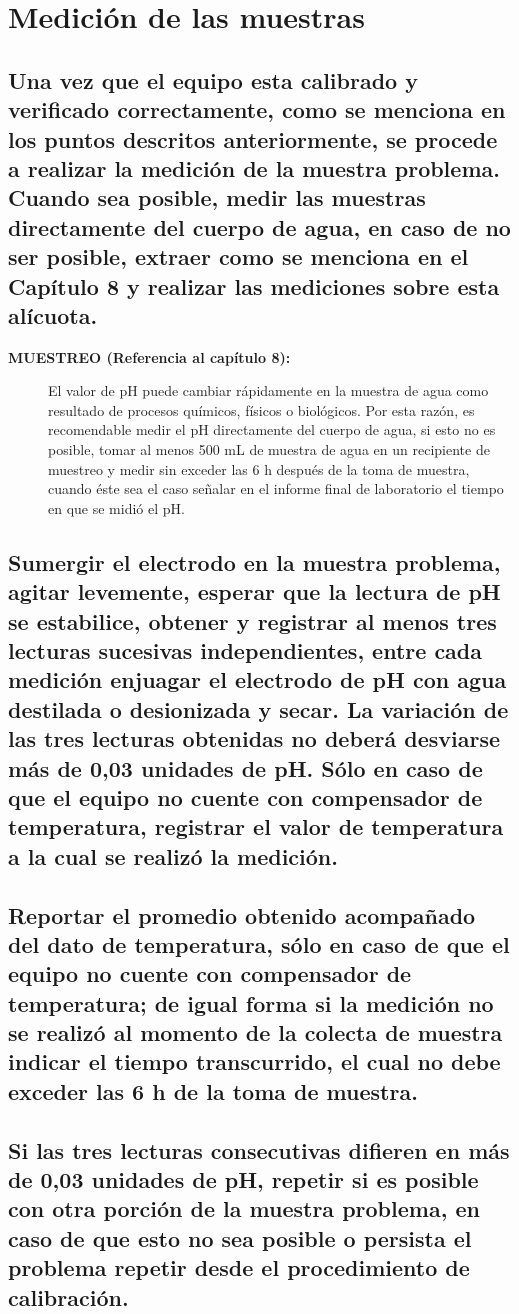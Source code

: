 \documentclass[spanish,12pt,letterpaper,titlepage]{article}
\theoremstyle{definition}
\begin{document}
	\section{Medición de las muestras}\label{9.3}
	\subsection{Una vez que el equipo esta calibrado y verificado correctamente, como se menciona en los puntos descritos anteriormente, se procede a realizar la medición de la muestra problema. Cuando sea posible, medir las muestras directamente del cuerpo de agua, en caso de no ser posible, extraer como se menciona en el Capítulo 8 y realizar las mediciones sobre esta alícuota.}\label{9.3.1}
	\begin{description}
		\item[\textbf{MUESTREO (Referencia al capítulo 8):}] El valor de pH puede cambiar rápidamente en la muestra de agua como resultado de procesos químicos, físicos o biológicos. Por esta razón, es recomendable medir el pH directamente del cuerpo de agua, si esto no es posible, tomar al menos 500 mL de muestra de agua en un recipiente de muestreo y medir sin exceder las 6 h después de la toma de muestra, cuando éste sea el caso señalar en el informe final de laboratorio el tiempo en que se midió el pH.
	\end{description}
	\subsection{Sumergir el electrodo en la muestra problema, agitar levemente, esperar que la lectura de pH se estabilice, obtener y registrar al menos tres lecturas sucesivas independientes, entre cada medición enjuagar el electrodo de pH con agua destilada o desionizada y secar. La variación de las tres lecturas obtenidas no deberá desviarse más de 0,03 unidades de pH. Sólo en caso de que el equipo no cuente con compensador de temperatura, registrar el valor de temperatura a la cual se realizó la medición.}\label{9.3.2}
	\subsection{Reportar el promedio obtenido acompañado del dato de temperatura, sólo en caso de que el equipo no cuente con compensador de temperatura; de igual forma si la medición no se realizó al momento de la colecta de muestra indicar el tiempo transcurrido, el cual no debe exceder las 6 h de la toma de muestra.}\label{9.3.3}
	\subsection{Si las tres lecturas consecutivas difieren en más de 0,03 unidades de pH, repetir si es posible con otra porción de la muestra problema, en caso de que esto no sea posible o persista el problema repetir desde el procedimiento de calibración.}\label{9.3.4}
\end{document}
